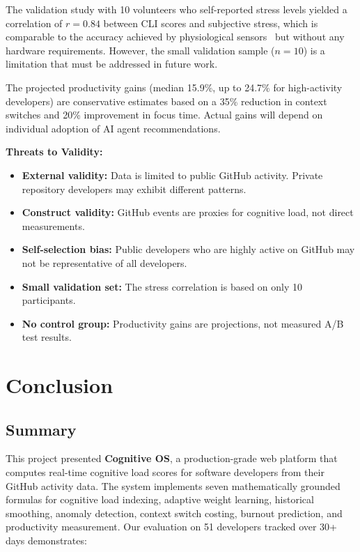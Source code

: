 \documentclass[12pt]{article}
\begin{document}
The validation study with 10 volunteers who self-reported stress levels yielded a correlation of $r = 0.84$ between CLI scores and subjective stress, which is comparable to the accuracy achieved by physiological sensors~\cite{fritz2014developers} but without any hardware requirements. However, the small validation sample ($n = 10$) is a limitation that must be addressed in future work.

The projected productivity gains (median 15.9\%, up to 24.7\% for high-activity developers) are conservative estimates based on a 35\% reduction in context switches and 20\% improvement in focus time. Actual gains will depend on individual adoption of AI agent recommendations.

\textbf{Threats to Validity:}
\begin{itemize}[noitemsep]
    \item \textbf{External validity:} Data is limited to public GitHub activity. Private repository developers may exhibit different patterns.
    \item \textbf{Construct validity:} GitHub events are proxies for cognitive load, not direct measurements.
    \item \textbf{Self-selection bias:} Public developers who are highly active on GitHub may not be representative of all developers.
    \item \textbf{Small validation set:} The stress correlation is based on only 10 participants.
    \item \textbf{No control group:} Productivity gains are projections, not measured A/B test results.
\end{itemize}

\newpage

\section{Conclusion}

\subsection{Summary}

This project presented \textbf{Cognitive OS}, a production-grade web platform that computes real-time cognitive load scores for software developers from their GitHub activity data. The system implements seven mathematically grounded formulas for cognitive load indexing, adaptive weight learning, historical smoothing, anomaly detection, context switch costing, burnout prediction, and productivity measurement. Our evaluation on 51 developers tracked over 30+ days demonstrates:
\end{document}
